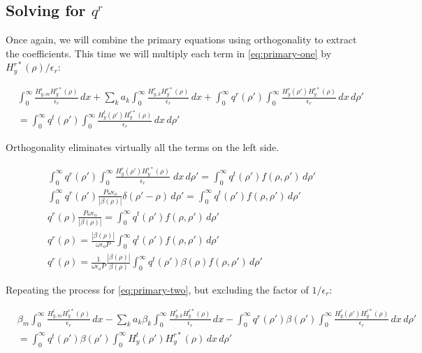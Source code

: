 \documentclass[11pt, oneside]{article}   	%
\begin{document}
\subsection{Solving for $q^{r}$}

Once again, we will combine the primary equations using orthogonality to extract the coefficients. This time we will multiply each term in \eqref{eq:primary-one} by $ H_{y}^{r*}(\rho) / \epsilon_{r}$:

\begin{align}
&\int_{0}^{\infty} \frac{H_{y,m}^{i} H_{y}^{r*}(\rho)}{\epsilon_{r}} \, dx
+ \sum_{k} a_{k} \int_{0}^{\infty}  \frac{H_{y,k}^{r} H_{y}^{r*}(\rho)}{\epsilon_{r}}\, dx 
+ \int_{0}^{\infty} q^{r} (\rho ') \int_{0}^{\infty} \frac{H_{y}^{r} (\rho ') H_{y}^{r*}(\rho)}{\epsilon_{r}} \, dx \, d\rho ' \nonumber \\
&= \int_{0}^{\infty} q^{t} (\rho ') \int_{0}^{\infty} \frac{H_{y}^{t} (\rho ') H_{y}^{r*}(\rho)}{\epsilon_{r}} \, dx \, d\rho '
\end{align}

\noindent Orthogonality eliminates virtually all the terms on the left side.

\begin{align}
\int_{0}^{\infty} q^{r}(\rho ') \int_{0}^{\infty} \frac{H_{y}^{r}(\rho ') H_{y}^{r*}(\rho)}{\epsilon_{r}} \; dx \, d\rho '= \int_{0}^{\infty} q^{t} (\rho ') f(\rho, \rho ') \, d\rho ' \nonumber \\
\int_{0}^{\infty} q^{r}(\rho ') \frac{P \omega \epsilon_{o}}{|\beta(\rho)|}\delta(\rho '-\rho) \, d\rho '
= \int_{0}^{\infty} q^{t} (\rho ') f(\rho, \rho ') \, d\rho ' \nonumber \\
q^{r}(\rho ) \frac{P \omega \epsilon_{o}}{|\beta(\rho)|} = \int_{0}^{\infty} q^{t} (\rho ') f(\rho, \rho ') \, d\rho ' \nonumber \\
q^{r}(\rho ) = \frac{|\beta(\rho)|}{\omega \epsilon_{o} P} \int_{0}^{\infty} q^{t} (\rho ') f(\rho, \rho ') \, d\rho ' \nonumber \\
q^{r}(\rho ) = \frac{1}{\omega \epsilon_{o} P} \frac{|\beta(\rho)|}{\beta(\rho)} \int_{0}^{\infty} q^{t} (\rho ') \beta(\rho) f(\rho, \rho ') \, d\rho '
\label{eq:qt-tm-1}
\end{align}

\noindent Repeating the process for \eqref{eq:primary-two}, but excluding the factor of $1/\epsilon_{r}$:

\begin{align}
&\beta_{m}\int_{0}^{\infty} \frac{H_{y,m}^{i} H_{y}^{r*}(\rho)}{\epsilon_{r}} \, dx
- \sum_{k} a_{k} \beta_{k} \int_{0}^{\infty}  \frac{H_{y,k}^{r} H_{y}^{r*}(\rho)}{\epsilon_{r}}\, dx 
- \int_{0}^{\infty} q^{r} (\rho ') \beta(\rho ')\int_{0}^{\infty} \frac{H_{y}^{r} (\rho ') H_{y}^{r*}(\rho)}{\epsilon_{r}} \, dx \, d\rho ' \nonumber \\
&= \int_{0}^{\infty} q^{t} (\rho ') \beta(\rho ')\int_{0}^{\infty} H_{y}^{t} (\rho ') H_{y}^{r*}(\rho) \, dx \, d\rho '
\end{align}
\end{document}
